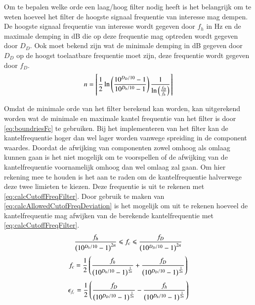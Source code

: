 Om te bepalen welke orde een laag/hoog filter nodig heeft is het belangrijk om te weten hoeveel het filter de hoogste signaal frequentie van interesse mag dempen. De hoogste signaal frequentie van interesse wordt gegeven door $f_h$ in Hz en de maximale demping in dB die op deze frequentie mag optreden wordt gegeven door $D_D$. Ook moet bekend zijn wat de minimale demping in dB gegeven door $D_D$ op de hoogst toelaatbare frequentie moet zijn, deze frequentie wordt gegeven door $f_D$.
\begin{equation} \label{eq:minOrderOfAAfilter}
    n=\left\lceil\frac{1}{2}\ln\left(\frac{10^{D_D/10}-1}{10^{D_h/10}-1}\right)\frac{1}{\ln\left(\frac{f_D}{f_h}\right)}\right\rceil
    \tagaddtext{[order]}
\end{equation}

Omdat de minimale orde van het filter berekend kan worden, kan uitgerekend worden wat de minimale en maximale kantel frequentie van het filter is door \cref{eq:boundriesFc} te gebruiken. Bij het implementeren van het filter kan de kantelfrequentie hoger dan wel lager worden vanwege spreiding in de component waardes. Doordat de afwijking van componenten zowel omhoog als omlaag kunnen gaan is het niet mogelijk om te voorspellen of de afwijking van de kantelfrequentie voornamelijk omhoog dan wel omlaag zal gaan. Om hier rekening mee te houden is het aan te raden om de kantelfrequentie halverwege deze twee limieten te kiezen. Deze frequentie is uit te rekenen met \cref{eq:calcCutoffFreqFilter}. Door gebruik te maken van \cref{eq:calcAllowedCutofFreqDeviation} is het mogelijk om uit te rekenen hoeveel de kantelfrequentie mag afwijken van de berekende kantelfrequentie met \cref{eq:calcCutoffFreqFilter}.
\begin{equation}\label{eq:boundriesFc}
    \frac{f_h}{\left(10^{D_h/10}-1\right)^{2n}}\leqslant f_c\leqslant\frac{f_D}{\left(10^{D_D/10}-1\right)^{2n}}
    \tagaddtext{[\si{\hertz}]}
\end{equation}
\begin{equation}\label{eq:calcCutoffFreqFilter}
    f_c=\frac{1}{2}\left(\frac{f_h}{\left(10^{D_h/10}-1\right)^{\frac{1}{2n}}}+\frac{f_D}{\left(10^{D_D/10}-1\right)^{\frac{1}{2n}}}\right)
    \tagaddtext{[\si{\hertz}]}
\end{equation}
\begin{equation}\label{eq:calcAllowedCutofFreqDeviation}
    \epsilon_{f_c}=\frac{1}{2}\left(\frac{f_D}{\left(10^{D_D/10}-1\right)^{\frac{1}{2n}}}-\frac{f_h}{\left(10^{D_h/10}-1\right)^{\frac{1}{2n}}}\right)
    \tagaddtext{[\si{\hertz}]}
\end{equation}

